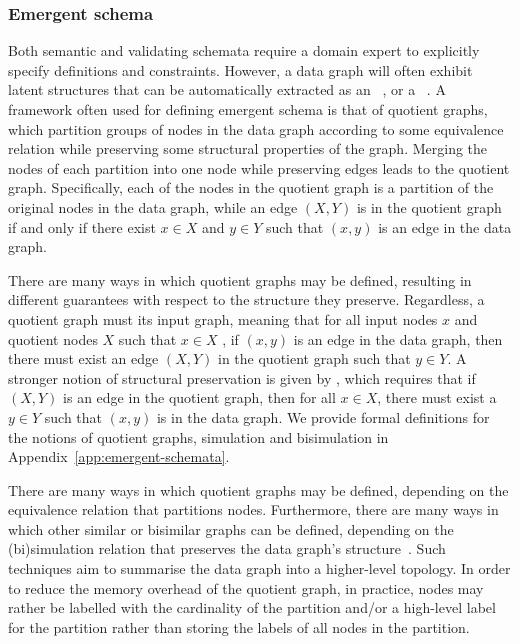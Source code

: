 \subsubsection{Emergent schema}
Both semantic and validating schemata require a domain expert to explicitly specify definitions and constraints. However, a data graph will often exhibit latent structures that can be automatically extracted as an ~\cite{Pham2015EmergenSchemaFromRDF}, or a ~\cite{Cebiric2019SummarizingSemanticGraphs}\cite{Liu2018GraphuSummarizationMethodsAndApplications}\cite{Spahiu2016ABSTAT}. A framework often used for defining emergent schema is that of quotient graphs, which partition groups of nodes in the data graph according to some equivalence relation while preserving some
structural properties of the graph. Merging the nodes of each partition into one node while preserving edges leads to the quotient graph. Specifically, each of the nodes in the quotient graph is a partition of the original nodes in the data graph, while an edge $(X,Y)$ is in the quotient graph if and only if there exist $x\in X$ and $y\in Y$ such that $(x,y)$ is an edge in the data graph. 

There are many ways in which quotient graphs may be defined, resulting in different guarantees with respect to the structure they preserve. Regardless, a quotient graph must  its input graph, meaning that for all input nodes $x$ and quotient nodes $X$ such that $x\in X$ , if $(x,y)$ is an edge in the data graph, then there must exist an edge $(X,Y)$ in the quotient graph such that $y\in Y$. A stronger notion of structural preservation is given by , which requires that if $(X,Y)$ is an edge in the quotient graph, then for all $x\in X$, there must exist a $y\in Y$ such that $(x,y)$ is in the data graph. We provide formal definitions for the notions of quotient graphs, simulation and bisimulation in Appendix~\ref{app:emergent-schemata}.

There are many ways in which quotient graphs may be defined, depending on the equivalence relation that partitions nodes. Furthermore, there are many ways in which other similar or bisimilar graphs can be defined, depending on the (bi)simulation relation that preserves the data graph’s structure~\cite{Cebiric2019SummarizingSemanticGraphs}. Such techniques aim to summarise the data graph into a higher-level topology. In order to reduce the memory overhead of the quotient graph, in practice, nodes may rather be labelled with the cardinality of the partition and/or a high-level label for the partition rather than storing the labels of all nodes in the partition.

